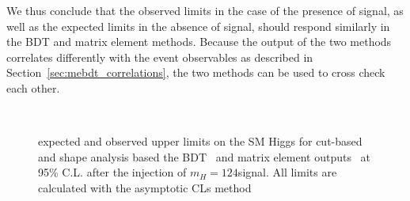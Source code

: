 We thus conclude that the observed limits in the case of the presence of signal,
as well as the expected limits in the absence of signal, should respond
similarly in the BDT and matrix element methods. Because 
the output of the two methods correlates differently with the 
event observables as described in Section~\ref{sec:mebdt_correlations}, 
the two methods can be used to cross check each other.

\begin{figure}[!hbtp]
\centering
{} \\
\centering
{}
\caption{ expected and observed upper limits on the SM Higgs for cut-based~ and 
shape analysis based the BDT~ and matrix element outputs~ 
at 95\% C.L. after the injection of $m_H=124$\GeVcc signal. All limits are calculated with the 
asymptotic CLs method}
\label{fig:me_results_hww124_5fb}
\end{figure}

